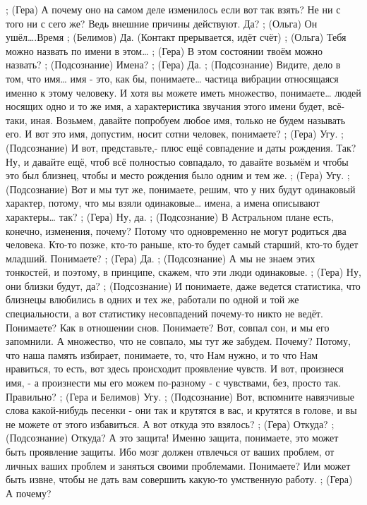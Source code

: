 ;	(Гера) А почему оно на самом деле изменилось если вот так взять? Не  ни с того ни с сего же? Ведь внешние причины действуют. Да? 
;	(Ольга) Он ушёл….Время
;	(Белимов) Да.
(Контакт прерывается, идёт счёт)
;	(Ольга) Тебя можно назвать по имени в этом…
;	(Гера) В этом состоянии твоём можно назвать?
;	(Подсознание) Имена?
;	(Гера) Да.
;	(Подсознание) Видите, дело в том, что имя… имя -  это, как бы, понимаете… частица вибрации относящаяся именно к этому человеку. И хотя вы можете иметь множество, понимаете… людей носящих одно и то же имя, а характеристика звучания этого имени будет, всё-таки, иная. Возьмем, давайте попробуем любое имя, только не будем называть его. И вот это имя, допустим, носит сотни человек, понимаете?
;	(Гера) Угу.
;	(Подсознание) И вот, представьте,- плюс ещё совпадение и даты рождения. Так? Ну, и давайте ещё, чтоб всё полностью совпадало, то давайте возьмём и чтобы это был близнец, чтобы и место рождения было одним и тем же. 
;	(Гера) Угу.
;	(Подсознание) Вот и мы тут же, понимаете, решим, что у них будут одинаковый характер, потому, что мы взяли одинаковые… имена, а имена описывают характеры… так?
;	(Гера) Ну, да.
;	(Подсознание) В Астральном плане есть, конечно, изменения, почему? Потому что одновременно не могут родиться два человека. Кто-то позже, кто-то раньше, кто-то будет самый старший, кто-то будет младший. Понимаете?
;	(Гера) Да.
;	(Подсознание) А мы не знаем этих тонкостей, и поэтому, в принципе, скажем, что эти люди одинаковые.
;	(Гера) Ну, они близки будут, да?
;	(Подсознание) И понимаете, даже ведется статистика, что близнецы влюбились в одних и тех же, работали по одной и той же специальности, а вот статистику несовпадений почему-то никто не ведёт. Понимаете? Как в отношении снов. Понимаете? Вот, совпал сон, и мы его запомнили. А множество, что не совпало, мы тут же забудем. Почему? Потому, что наша память избирает, понимаете, то, что Нам нужно, и то что Нам нравиться, то есть, вот здесь происходит проявление чувств. И вот, произнеся имя, - а произнести мы его можем по-разному - с чувствами, без, просто так. Правильно?
;	(Гера и Белимов)  Угу.
;	(Подсознание) Вот, вспомните навязчивые слова какой-нибудь песенки - они так и крутятся в вас, и крутятся в голове, и вы не можете от этого избавиться. А вот откуда это взялось?
;	(Гера) Откуда?
;	(Подсознание) Откуда? А это защита! Именно защита, понимаете, это может быть проявление защиты. Ибо мозг должен отвлечься от ваших проблем, от личных ваших проблем и заняться своими проблемами. Понимаете? Или  может быть извне, чтобы не дать вам совершить какую-то умственную работу. 
;	(Гера) А почему?
